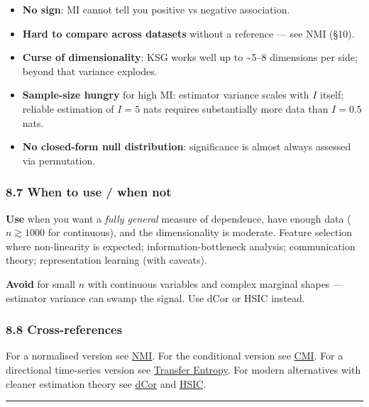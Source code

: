 \documentclass{article}
\providecommand{\tightlist}{\setlength{\itemsep}{0pt}\setlength{\parskip}{0pt}}
\begin{document}
\begin{itemize}
\tightlist
\item
  \textbf{No sign}: MI cannot tell you positive vs negative association.
\item
  \textbf{Hard to compare across datasets} without a reference --- see
  NMI (§10).
\item
  \textbf{Curse of dimensionality}: KSG works well up to
  \textasciitilde5--8 dimensions per side; beyond that variance
  explodes.
\item
  \textbf{Sample-size hungry} for high MI: estimator variance scales
  with \(I\) itself; reliable estimation of \(I = 5\) nats requires
  substantially more data than \(I = 0.5\) nats.
\item
  \textbf{No closed-form null distribution}: significance is almost
  always assessed via permutation.
\end{itemize}

\subsubsection{8.7 When to use / when
not}\label{87-when-to-use--when-not}

\textbf{Use} when you want a \emph{fully general} measure of dependence,
have enough data (\(n \gtrsim 1000\) for continuous), and the
dimensionality is moderate. Feature selection where non-linearity is
expected; information-bottleneck analysis; communication theory;
representation learning (with caveats).

\textbf{Avoid} for small \(n\) with continuous variables and complex
marginal shapes --- estimator variance can swamp the signal. Use dCor or
HSIC instead.

\subsubsection{8.8 Cross-references}\label{88-cross-references}

For a normalised version see
\hyperref[10-normalized-mutual-information-nmi]{NMI}. For the
conditional version see
\hyperref[12-conditional-mutual-information-cmi]{CMI}. For a directional
time-series version see \hyperref[11-transfer-entropy]{Transfer
Entropy}. For modern alternatives with cleaner estimation theory see
\hyperref[13-distance-correlation-dcor]{dCor} and
\hyperref[16-hilbertschmidt-independence-criterion-hsic]{HSIC}.

\begin{center}\rule{0.5\linewidth}{0.5pt}\end{center}
\end{document}
